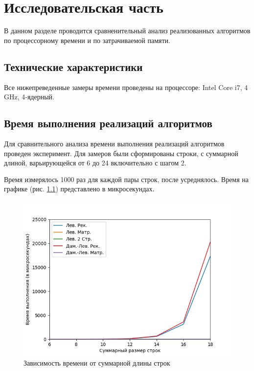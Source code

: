 \documentclass{report}
\begin{document}
\chapter{Исследовательская часть}
В данном разделе проводится сравненительный анализ реализованных алгоритмов по процессорному времени и по затрачиваемой памяти.
\section{Технические характеристики}

Все нижепреведенные замеры времени проведены на процессоре: Intel Core i7, 4 GHz, 4‑ядерный.

\section{Время выполнения реализаций алгоритмов}

Для сравнительного анализа времени выполнения реализаций алгоритмов проведен эксперимент. Для замеров были сформированы строки, с суммарной длиной, варьирующейся от 6 до 24 включительно с шагом 2.

Время измерялось 1000 раз для каждой пары строк, после усреднялось. Время на графике (рис. \ref{fig:mpr6}) представлено в микросекундах. 

\begin{figure}[h!p]\label{1}
	\centering
	\includegraphics[scale = 0.85]{gr.png}
	\caption{Зависимость времени от суммарной длины строк}
	\label{fig:mpr6}
\end{figure}

\newpage
\end{document}
